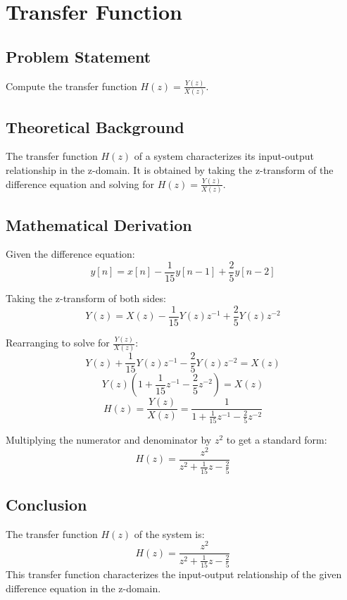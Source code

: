 \item[(c)]
\section{Transfer Function}

\subsection*{Problem Statement}
Compute the transfer function \( H(z) = \frac{Y(z)}{X(z)} \).

\subsection*{Theoretical Background}
The transfer function \( H(z) \) of a system characterizes its input-output relationship in the z-domain. It is obtained by taking the z-transform of the difference equation and solving for \( H(z) = \frac{Y(z)}{X(z)} \).

\subsection*{Mathematical Derivation}
Given the difference equation:
\[ y[n] = x[n] - \frac{1}{15} y[n-1] + \frac{2}{5} y[n-2] \]

Taking the z-transform of both sides:
\[ Y(z) = X(z) - \frac{1}{15} Y(z) z^{-1} + \frac{2}{5} Y(z) z^{-2} \]

Rearranging to solve for \( \frac{Y(z)}{X(z)} \):
\[ Y(z) + \frac{1}{15} Y(z) z^{-1} - \frac{2}{5} Y(z) z^{-2} = X(z) \]
\[ Y(z) \left( 1 + \frac{1}{15} z^{-1} - \frac{2}{5} z^{-2} \right) = X(z) \]
\[ H(z) = \frac{Y(z)}{X(z)} = \frac{1}{1 + \frac{1}{15} z^{-1} - \frac{2}{5} z^{-2}} \]

Multiplying the numerator and denominator by \( z^2 \) to get a standard form:
\[ H(z) = \frac{z^2}{z^2 + \frac{1}{15} z - \frac{2}{5}} \]

\subsection*{Conclusion}
The transfer function \( H(z) \) of the system is:
\[ H(z) = \frac{z^2}{z^2 + \frac{1}{15} z - \frac{2}{5}} \]
This transfer function characterizes the input-output relationship of the given difference equation in the z-domain.
